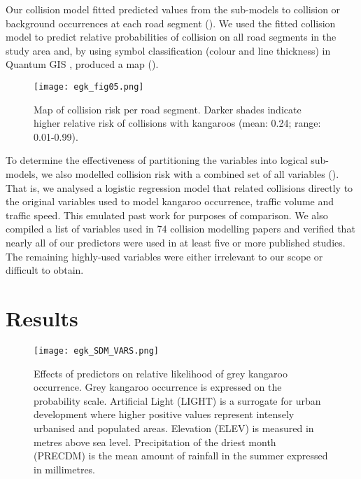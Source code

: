 Our collision model fitted predicted values from the sub-models to collision or background occurrences at each road segment (). We used the fitted collision model to predict relative probabilities of collision on all road segments in the study area and, by using symbol classification (colour and line thickness) in Quantum GIS \citep{qgis09}, produced a map ().

\begin{figure*}[htp]
  \centering
  \texttt{[image: egk\_fig05.png]}
  \caption[Map of collision risk per road segment in Victoria]{Map of collision risk per road segment. Darker shades indicate higher relative risk of collisions with kangaroos (mean: 0.24; range: 0.01-0.99).}
  \label{egk_collmap}
\end{figure*}

To determine the effectiveness of partitioning the variables into logical sub-models, we also modelled collision risk with a combined set of all variables (). That is, we analysed a logistic regression model that related collisions directly to the original variables used to model kangaroo occurrence, traffic volume and traffic speed. This emulated past work for purposes of comparison. We also compiled a list of variables used in 74 collision modelling papers and verified that nearly all of our predictors were used in at least five or more published studies. The remaining highly-used variables were either irrelevant to our scope or difficult to obtain.

\section{Results}

\begin{figure*}[htp]
  \centering
  \texttt{[image: egk\_SDM\_VARS.png]}
  \caption[Effects of predictors on relative likelihood of grey kangaroo occurrence]{Effects of predictors on relative likelihood of grey kangaroo occurrence. Grey kangaroo occurrence  is expressed on the probability scale. Artificial Light (LIGHT) is a surrogate for urban development where higher positive values represent intensely urbanised and populated areas. Elevation (ELEV) is measured in metres above sea level. Precipitation of the driest month (PRECDM) is the mean amount of rainfall in the summer expressed in millimetres.}
  \label{egk_sdm_vars}
\end{figure*}

